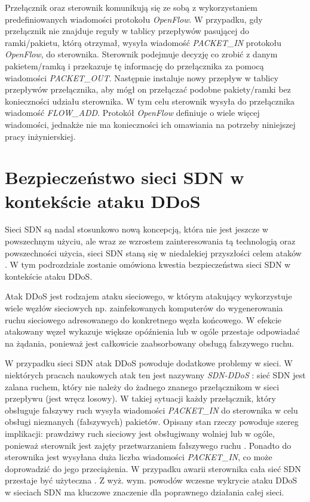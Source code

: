 Przełącznik oraz sterownik komunikują się ze sobą z wykorzystaniem
predefiniowanych wiadomości protokołu \textit{OpenFlow}. W przypadku, gdy
przełącznik nie znajduje reguły w tablicy przepływów pasującej do ramki/pakietu,
którą otrzymał, wysyła wiadomość \textit{PACKET\_IN} protokołu
\textit{OpenFlow}, do sterownika. Sterownik podejmuje decyzję co zrobić z danym 
pakietem/ramką i przekazuje tę informację do przełącznika za pomocą wiadomości
\mbox{\textit{PACKET\_OUT}}. Następnie instaluje nowy przepływ w tablicy przepływów
przełącznika, aby mógł on przełączać podobne pakiety/ramki bez konieczności
udziału sterownika. W tym celu sterownik wysyła do przełącznika wiadomość
\textit{FLOW\_ADD}. Protokół \textit{OpenFlow} definiuje o wiele więcej
wiadomości, jednakże nie ma konieczności ich omawiania na potrzeby niniejszej
pracy inżynierskiej.

\section{Bezpieczeństwo sieci SDN w kontekście ataku DDoS}

Sieci SDN są nadal stosunkowo nową koncepcją, która nie jest jeszcze w
powszechnym użyciu, ale wraz ze wzrostem zainteresowania tą technologią oraz
powszechności użycia, sieci SDN staną się w niedalekiej przyszłości celem ataków
\cite{sdnsecurityblog}. W tym podrozdziale zostanie omówiona kwestia
bezpieczeństwa sieci SDN w kontekście ataku DDoS.

Atak DDoS jest rodzajem ataku sieciowego, w którym atakujący wykorzystuje wiele
węzłów sieciowych np. zainfekowanych komputerów do wygenerowania ruchu
sieciowego adresowanego do konkretnego węzła końcowego. W efekcie atakowany
węzeł wykazuje większe opóźnienia lub w ogóle przestaje odpowiadać na żądania,
ponieważ jest całkowicie zaabsorbowany obsługą fałszywego ruchu.

W przypadku sieci SDN atak DDoS powoduje dodatkowe problemy w sieci. W
niektórych pracach naukowych atak ten jest nazywany \textit{SDN-DDoS}
\cite{ddosbronksarticle}: sieć SDN jest zalana ruchem, który nie należy do
żadnego znanego przełącznikom w sieci przepływu (jest wręcz losowy). W takiej
sytuacji każdy przełącznik, który obsługuje fałszywy ruch wysyła wiadomości
\textit{PACKET\_IN} do sterownika w celu obsługi nieznanych (fałszywych)
pakietów. Opisany stan rzeczy powoduje szereg implikacji: prawdziwy ruch
sieciowy jest obsługiwany wolniej lub w ogóle, ponieważ sterownik jest zajęty
przetwarzaniem fałszywego ruchu \cite{indiaarticle}. Ponadto do sterownika jest
wysyłana duża liczba wiadomości \textit{PACKET\_IN}, co może doprowadzić do jego
przeciążenia. W przypadku awarii sterownika cała sieć SDN przestaje być
użyteczna \cite{ddoskoreaarticle}. Z wyż. wym. powodów wczesne wykrycie ataku
DDoS w sieciach SDN ma kluczowe znaczenie dla poprawnego działania całej sieci.

